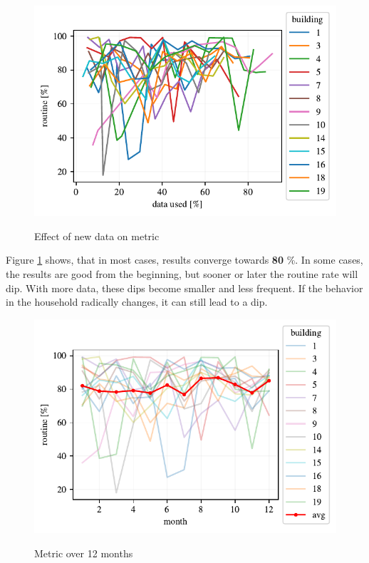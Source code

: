 \begin{figure}[H]
	\centering
	\caption{Effect of new data on metric}
	\includegraphics[]{Figures/EC/DYN/efect_of_data_on_metric.pdf}
	\label{fig:efect_of_data_on_metric}
\end{figure}

Figure \ref{fig:efect_of_data_on_metric} shows, that in most cases, results converge towards \textbf{80} \%. 
In some cases, the results are good from the beginning, but sooner or later the routine rate will dip. 
With more data, these dips become smaller and less frequent. 
If the behavior in the household radically changes, it can still lead to a dip.

\begin{figure}[H]
	\centering
	\caption{Metric over 12 months}
	\includegraphics[]{Figures/EC/DYN/1_year_of_iterative_learning_avg.pdf}
	\label{fig:1_year_of_iterative_learning_avg}
\end{figure}

